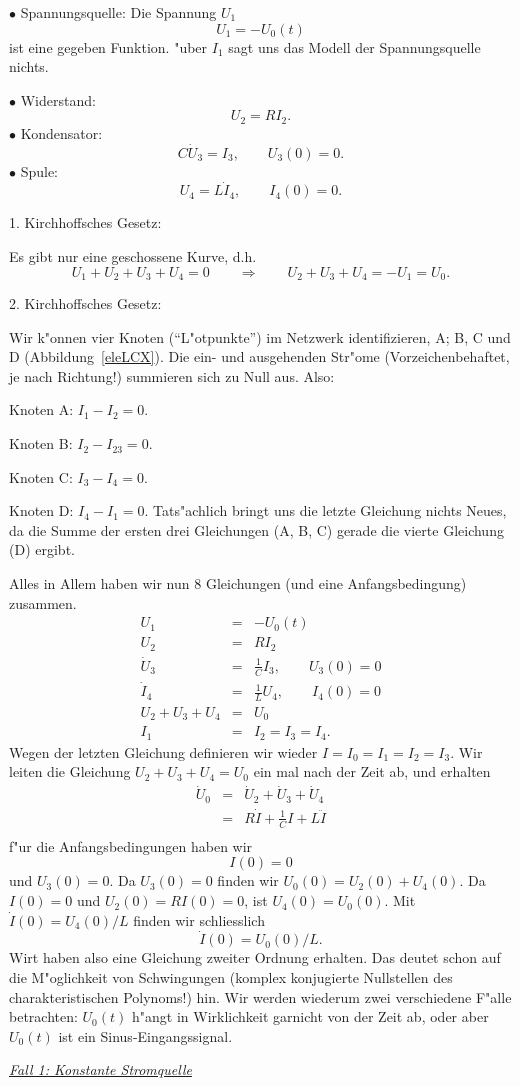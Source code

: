 $\bullet$ Spannungsquelle:
Die Spannung $U_1$ 
$$U_1 = - U_0(t)$$
ist eine gegeben Funktion. "uber $I_1$ sagt uns das Modell der Spannungsquelle nichts.\par
$\bullet$ Widerstand:
$$U_2 = R I_2. $$
$\bullet$ Kondensator:
$$ C \dot U_3 = I_3,\qquad U_3(0) = 0.$$
$\bullet$ Spule:
$$ U_4 = L \dot I_4,\qquad I_4(0) = 0.$$

1. Kirchhoffsches Gesetz:\par
Es gibt nur eine geschossene Kurve, d.h.
$$ U_1 +U_2+U_3+U_4 = 0\qquad\Rightarrow\qquad  U_2 + U_3 + U_4= -U_1=U_0.$$

2. Kirchhoffsches Gesetz:\par
Wir k"onnen vier Knoten (``L"otpunkte'') im Netzwerk identifizieren, A; B, C und D (Abbildung~\ref{eleLCX}). 
Die ein- und ausgehenden Str"ome (Vorzeichenbehaftet, je nach Richtung!) summieren sich zu Null aus.
Also:\par
Knoten A:  $I_1 - I_2 = 0$.\par
Knoten B:  $I_2- I_23= 0$.\par
Knoten C:  $I_3- I_4 = 0$.\par
Knoten D:  $I_4 - I_1  = 0$.
Tats"achlich bringt uns die letzte Gleichung nichts Neues, da die Summe der ersten drei Gleichungen (A, B, C)
gerade die vierte Gleichung (D) ergibt. 

Alles in Allem haben wir nun 8 Gleichungen (und eine Anfangsbedingung) zusammen.
\begin{eqnarray*}
U_1 & = & - U_0(t)\\
U_2 & = & R I_2\\
\dot U_3 & = & \frac 1 C I_3,\qquad U_3(0) = 0\\
 \dot I_4 & = & \frac 1 L U_4,\qquad I_4(0) = 0\\
U_2+U_3+U_4 & = & U_0\\
I_1 & = & I_2 = I_3 = I_4.
\end{eqnarray*}
Wegen der letzten Gleichung definieren wir wieder $I=I_0=I_1=I_2=I_3$. Wir leiten die Gleichung 
$U_2+U_3+U_4=U_0$ ein mal nach der Zeit ab, und erhalten
\begin{eqnarray*}
\dot U_0 & = & \dot U_2+\dot U_3+\dot U_4\\
& = & R \dot I + \frac 1 C  I + L \ddot I\\ 
\end{eqnarray*}
f"ur die Anfangsbedingungen haben wir
$$ I(0) = 0$$
und $U_3(0)=0$. Da $U_3(0)=0$ finden wir $U_0(0)=U_2(0)+U_4(0)$. Da $I(0)=0$ und $U_2(0)=RI(0)=0$, ist
$U_4(0)=U_0(0)$. Mit $\dot I(0) = U_4(0)/L$ finden wir schliesslich
$$ \dot I(0) = U_0(0)/L.$$
Wirt haben also eine Gleichung zweiter Ordnung erhalten. Das deutet schon auf die M"oglichkeit
von Schwingungen (komplex konjugierte Nullstellen des charakteristischen Polynoms!) hin.
Wir werden wiederum zwei verschiedene F"alle betrachten: $U_0(t)$ h"angt in Wirklichkeit garnicht von
der Zeit ab, oder aber $U_0(t)$ ist ein Sinus-Eingangssignal.
\par\medskip
\underline{{\it Fall 1: Konstante Stromquelle}}\par

